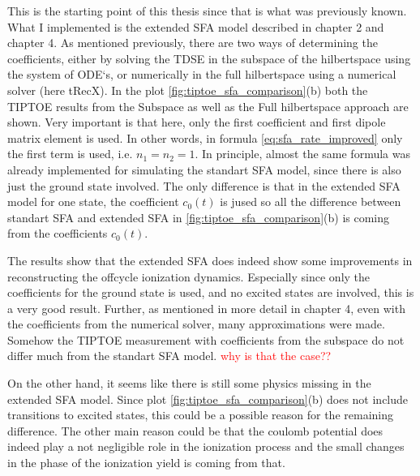 This is the starting point of this thesis since that is what was previously known.
What I implemented is the extended SFA model described in chapter 2 and chapter 4.
As mentioned previously, there are two ways of determining the coefficients, either by solving the TDSE in the subspace of the hilbertspace using the system of ODE`s, or numerically in the full hilbertspace using a numerical solver (here tRecX).
In the plot \ref{fig:tiptoe_sfa_comparison}(b) both the TIPTOE results from the Subspace as well as the Full hilbertspace approach are shown.
Very important is that here, only the first coefficient and first dipole matrix element is used.
In other words, in formula \eqref{eq:sfa_rate_improved} only the first term is used, i.e. $n_1=n_2=1$.
In principle, almost the same formula was already implemented for simulating the standart SFA model, since there is also just the ground state involved.
The only difference is that in the extended SFA model for one state, the coefficient $c_0(t)$ is jused so all the difference between standart SFA and extended SFA in \ref{fig:tiptoe_sfa_comparison}(b) is coming from the coefficients $c_0(t)$.

\medskip
The results show that the extended SFA does indeed show some improvements in reconstructing the offcycle ionization dynamics.
Especially since only the coefficients for the ground state is used, and no excited states are involved, this is a very good result.
Further, as mentioned in more detail in chapter 4, even with the coefficients from the numerical solver, many approximations were made.
Somehow the TIPTOE measurement with coefficients from the subspace do not differ much from the standart SFA model.
\textcolor{red}{why is that the case??}

On the other hand, it seems like there is still some physics missing in the extended SFA model.
Since plot \ref{fig:tiptoe_sfa_comparison}(b) does not include transitions to excited states, this could be a possible reason for the remaining difference.
The other main reason could be that the coulomb potential does indeed play a not negligible role in the ionization process and the small changes in the phase of the ionization yield is coming from that.

